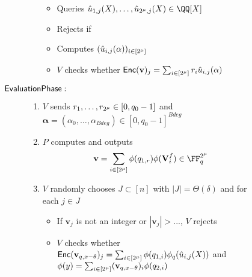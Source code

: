 \documentclass[11pt,letterpaper,usenames,dvipsnames]{article}
\begin{document}
\begin{figure}[H]
\begin{framed}
\begin{description}
\begin{enumerate}
\begin{itemize}
							\item Queries $\hat{u}_{1,j}(X), \ldots, \hat{u}_{\size, j}(X)\in \QQ[X]$
							\item Rejects if
							\item Computes $(\hat{u}_{i,j}(\mathbf \alpha))_{i\in[2^\mu]}$
							\item $V$ checks whether $\mathsf{Enc}(\mathbf v)_j=\sum_{i\in[2^\mu]}r_i\hat{u}_{i,j}(\mathbf{\alpha})$
						\end{itemize}
				\end{enumerate}
		\item[$\mathsf{Evaluation Phase}:$]				
				\begin{enumerate}
					\item $V$ sends $r_1, \ldots, r_{2^\mu}\in[0, q_0-1]$ and $\mathbf \alpha=(\alpha_0, \ldots, \alpha_{Bdeg})\in[0, q_0-1]^{Bdeg}$
					\item $P$ computes and outputs 
					$$\mathbf{v}=\sum_{i\in[\size]}\phi(q_{1,r})\phi(\matrixV^f_i)\in \FF_q^{\size}$$
					\item $V$ randomly chooses $J\subset[n]$ with $|J|=\Theta(\delta)$ and for each $j\in J$
					\begin{itemize}
						\item If $\mathbf v_j$ is not an integer or $|\mathbf v_j|>...$, $V$ rejects
						\item $V$ checks whether $\mathsf{Enc}(\mathbf v_{q, x-\theta})_j=\sum_{i\in[2^\mu]}\phi(q_{1,i})\phi_q(\hat{u}_{i,j}(X))$ and $\phi(y)=\sum_{i\in[2^\mu]}(\mathbf v_{q, x-\theta})_i\phi(q_{2,i})$
					\end{itemize}
				\end{enumerate}
		\end{description}		
	\end{framed}
\end{figure}

\renewcommand*{\bibfont}{\small}
\printbibliography
\end{document}
